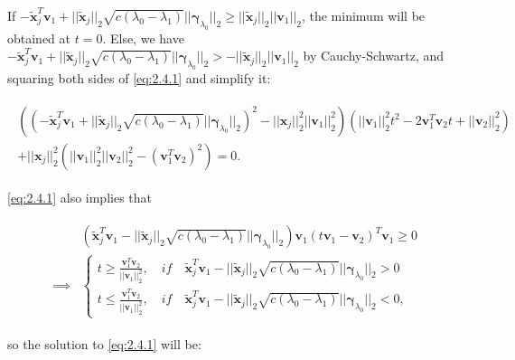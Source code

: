If $-\tilde{\boldsymbol x}_j^T\boldsymbol v_1+||\tilde{\boldsymbol x}_j||_2\sqrt{c(\lambda_0-\lambda_1)}||\boldsymbol\gamma_{\lambda_0}||_2\geq ||\tilde{\boldsymbol x}_j||_2||\boldsymbol v_1||_2$, the minimum will be obtained at $t=0$. Else, we have $-\tilde{\boldsymbol x}_j^T\boldsymbol v_1+||\tilde{\boldsymbol x}_j||_2\sqrt{c(\lambda_0-\lambda_1)}||\boldsymbol\gamma_{\lambda_0}||_2>- ||\tilde{\boldsymbol x}_j||_2||\boldsymbol v_1||_2$ by Cauchy-Schwartz, and squaring both sides of \eqref{eq:2.4.1} and simplify it:

\begin{gather}
    \begin{aligned}
        \left(\left(-\tilde{\boldsymbol x}_j^T\boldsymbol v_1+||\tilde{\boldsymbol x}_j||_2\sqrt{c(\lambda_0-\lambda_1)}||\boldsymbol\gamma_{\lambda_0}||_2\right)^2-||\boldsymbol x_j||_2^2||\boldsymbol v_1||_2^2\right)\left(||\boldsymbol v_1||_2^2t^2-2\boldsymbol v_1^T\boldsymbol v_2 t+||\boldsymbol v_2||_2^2\right)\\
        +||\boldsymbol x_j||_2^2(||\boldsymbol v_1||_2^2||\boldsymbol v_2||_2^2-(\boldsymbol v_1^T\boldsymbol v_2)^2)=0.
    \end{aligned}
\end{gather}

\eqref{eq:2.4.1} also implies that

\begin{gather}
    \begin{aligned}
        &\left(\tilde{\boldsymbol x}_j^T\boldsymbol v_1-||\tilde{\boldsymbol x}_j||_2\sqrt{c(\lambda_0-\lambda_1)}||\boldsymbol\gamma_{\lambda_0}||_2\right)\boldsymbol v_1(t\boldsymbol v_1-\boldsymbol v_2)^T\boldsymbol v_1\geq 0\\
        \implies&\begin{cases}
        t\geq\frac{\boldsymbol v_1^T\boldsymbol v_2}{||\boldsymbol v_1||_2^2},\quad \textit{if}\quad\tilde{\boldsymbol x}_j^T\boldsymbol v_1-||\tilde{\boldsymbol x}_j||_2\sqrt{c(\lambda_0-\lambda_1)}||\boldsymbol\gamma_{\lambda_0}||_2 >0\\
        t\leq\frac{\boldsymbol v_1^T\boldsymbol v_2}{||\boldsymbol v_1||_2^2},\quad \textit{if}\quad\tilde{\boldsymbol x}_j^T\boldsymbol v_1-||\tilde{\boldsymbol x}_j||_2\sqrt{c(\lambda_0-\lambda_1)}||\boldsymbol\gamma_{\lambda_0}||_2<0,
        \end{cases}
    \end{aligned}
\end{gather}

so the solution to \eqref{eq:2.4.1} will be:


